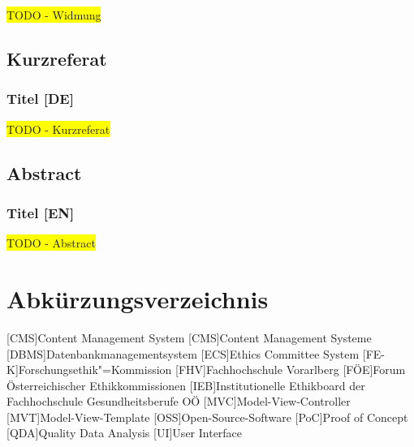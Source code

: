 \documentclass[a4paper,12pt,twoside]{scrreprt}
\begin{document}
\colorbox{yellow}{TODO - Widmung}

\newpage
\section*{Kurzreferat}
\label{sec:abstract-de}

\subsection*{Titel [DE]}

\colorbox{yellow}{TODO - Kurzreferat}

\newpage
\section*{Abstract}
\label{sec:abstract-en}

\subsection*{Titel [EN]}

\colorbox{yellow}{TODO - Abstract}

\cleardoublepage
\tableofcontents

\clearpage
{}
{}
\listoffigures

\clearpage
{}
{}
\listoftables

\clearpage
{}
{}
\chapter*{Abkürzungsverzeichnis}

\begin{acronym}
    [CMS]{Content Management System}
    [CMS]{Content Management Systeme}
    [DBMS]{Datenbankmanagementsystem}
    [ECS]{Ethics Committee System}
    [FE-K]{Forschungsethik"=Kommission}
    [FHV]{Fachhochschule Vorarlberg}
    [FÖE]{Forum Österreichischer Ethikkommissionen}
    [IEB]{Institutionelle Ethikboard der Fachhochschule Gesundheitsberufe OÖ}
    [MVC]{Model-View-Controller}
    [MVT]{Model-View-Template}
    [OSS]{Open-Source-Software}
    [PoC]{Proof of Concept}
    [QDA]{Quality Data Analysis}
    [UI]{User Interface}
\end{acronym}
\end{document}
